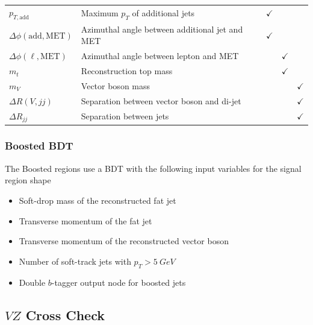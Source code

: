 \documentclass{beamer}
\begin{document}
\begin{frame}
{\begin{tabularx}{\textwidth}{|l|X|c|c|c|}
    $p_{T,\mathrm{add}}$ & Maximum $p_T$ of additional jets & $\checkmark$ & & \\
    $\Delta\phi(\mathrm{add, MET})$ & Azimuthal angle between additional jet and MET & $\checkmark$ & & \\
    \hline
    $\Delta\phi(\ell, \mathrm{MET})$ & Azimuthal angle between lepton and MET & & $\checkmark$ & \\
    $m_t$ & Reconstruction top mass & & $\checkmark$ & \\
    $m_V$ & Vector boson mass & & & $\checkmark$ \\
    \hline
    $\Delta R(V, jj)$ & Separation between vector boson and di-jet & & & $\checkmark$ \\
    $\Delta R_{jj}$ & Separation between jets & & & $\checkmark$ \\
    \hline
  \end{tabularx}
  }

\end{frame}

\begin{frame}
  \frametitle{Boosted BDT}

  The Boosted regions use a BDT with the following input variables for the signal region shape

  \vfill

  \begin{itemize}
  \item Soft-drop mass of the reconstructed fat jet
  \item Transverse momentum of the fat jet
  \item Transverse momentum of the reconstructed vector boson
  \item Number of soft-track jets with $p_T > \SI{5}{GeV}$
  \item Double $b$-tagger output node for boosted jets
  \end{itemize}

\end{frame}

\subsection{$V\!Z$ Cross Check}

%
%
%
\end{document}
